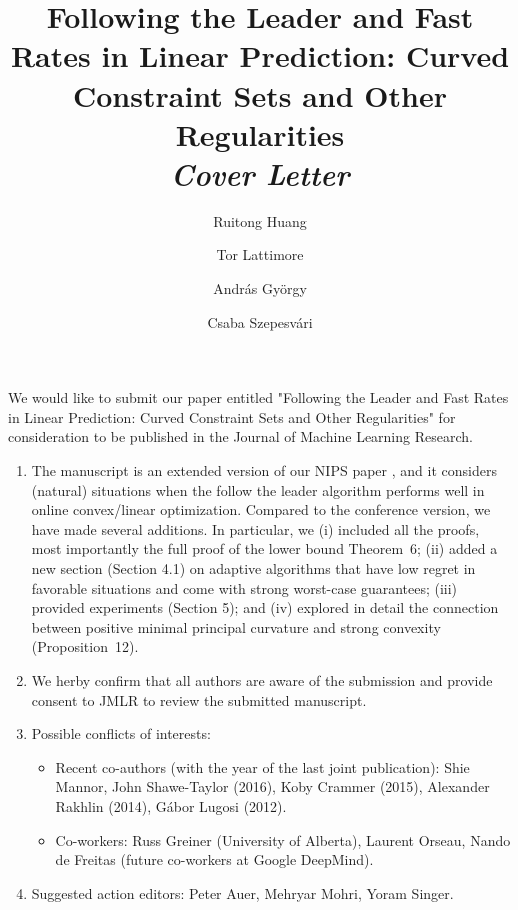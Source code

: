 \documentclass[11pt,english]{article}
\title{Following the Leader and
Fast Rates in Linear Prediction:
Curved Constraint Sets and Other Regularities \\
\emph{Cover Letter}}
\author{Ruitong Huang \and Tor Lattimore \and Andr\'as Gy\"orgy \and Csaba Szepesv\'ari}
\begin{document}
\maketitle

We would like to submit our paper entitled "Following the Leader and
Fast Rates in Linear Prediction: Curved Constraint Sets and Other Regularities" for consideration to be published in the Journal of Machine Learning Research.

\begin{enumerate}
\item The manuscript is an extended version of our NIPS paper \citep{HuLaGySz16}, and it considers (natural) situations when the follow the leader algorithm performs well in online convex/linear optimization. Compared to the conference version, we have made several additions. In particular, we (i) included all the proofs, most importantly the full proof of the lower bound Theorem~6; (ii) added a new section (Section 4.1) on adaptive algorithms that have low regret in favorable situations and come with strong worst-case guarantees; (iii) provided experiments (Section 5); and (iv) explored in detail the connection between positive minimal principal curvature and strong convexity (Proposition~12).

\item We herby confirm that all authors are aware of the submission and provide consent to JMLR to review the submitted manuscript.

\item Possible conflicts of interests:
\begin{itemize}
\item Recent co-authors (with the year of the last joint publication): Shie Mannor, John Shawe-Taylor (2016), Koby Crammer (2015), Alexander Rakhlin (2014), G\'abor Lugosi (2012).
\item Co-workers: Russ Greiner (University of Alberta), Laurent Orseau, Nando de Freitas (future co-workers at Google DeepMind).
\end{itemize}

\item Suggested action editors:
Peter Auer, Mehryar Mohri, Yoram Singer.
\end{enumerate}


\end{document}
